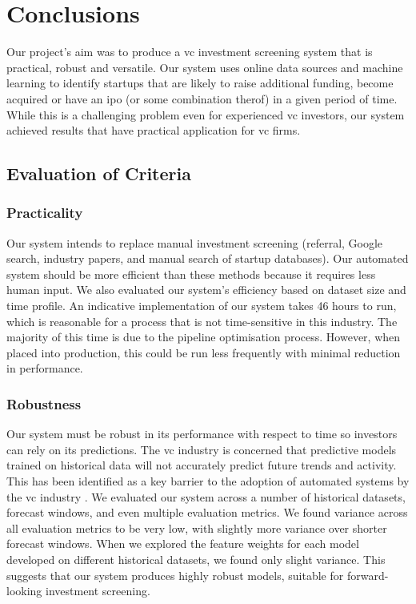 \documentclass[../thesis/thesis.tex]{subfiles}
\begin{document}
 \chapter{Conclusions}
 \label{chap:conclusions}

Our project's aim was to produce a \gls{vc} investment screening system that is practical, robust and versatile. Our system uses online data sources and machine learning to identify startups that are likely to raise additional funding, become acquired or have an \gls{ipo} (or some combination therof) in a given period of time. While this is a challenging problem even for experienced \gls{vc} investors, our system achieved results that have practical application for \gls{vc} firms.

\section{Evaluation of Criteria}

\subsection{Practicality}

Our system intends to replace manual investment screening (referral, Google search, industry papers, and manual search of startup databases). Our automated system should be more efficient than these methods because it requires less human input. We also evaluated our system's efficiency based on dataset size and time profile. An indicative implementation of our system takes 46 hours to run, which is reasonable for a process that is not time-sensitive in this industry. The majority of this time is due to the pipeline optimisation process. However, when placed into production, this could be run less frequently with minimal reduction in performance.

\subsection{Robustness}

Our system must be robust in its performance with respect to time so investors can rely on its predictions. The \gls{vc} industry is concerned that predictive models trained on historical data will not accurately predict future trends and activity. This has been identified as a key barrier to the adoption of automated systems by the \gls{vc} industry \cite{stone2014}. We evaluated our system across a number of historical datasets, forecast windows, and even multiple evaluation metrics. We found variance across all evaluation metrics to be very low, with slightly more variance over shorter forecast windows. When we explored the feature weights for each model developed on different historical datasets, we found only slight variance. This suggests that our system produces highly robust models, suitable for forward-looking investment screening.
\end{document}
